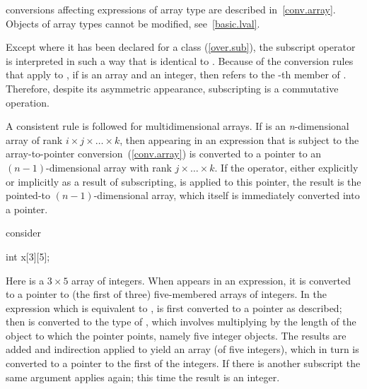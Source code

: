 \pnum
\begin{note}
conversions affecting expressions of array type are described in~\ref{conv.array}.
Objects of array types cannot be modified, see~\ref{basic.lval}.
\end{note}

\pnum
\begin{note}
Except where it has been declared for a class (\ref{over.sub}),
the subscript operator
\tcode{[]}
is interpreted
in such a way that
is identical to
.
Because of the conversion rules
that apply to
\tcode{+},
if
is an array and
an integer,
then
refers to the
-th
member of
.
Therefore,
despite its asymmetric
appearance, subscripting is a commutative operation.

\pnum
A consistent rule is followed for
%
multidimensional arrays.
If
is an
\textit{n}-dimensional
array
of rank
$i \times j \times \ldots \times k$,
then
appearing in an expression
that is subject to the array-to-pointer conversion~(\ref{conv.array})
is converted to
a pointer to an $(n-1)$-dimensional
array with rank
$j \times \ldots \times k$.
If the
\tcode{*}
operator, either explicitly
or implicitly as a result of subscripting,
is applied to this pointer,
the result is the pointed-to $(n-1)$-dimensional array,
which itself is immediately converted into a pointer.

\pnum
\begin{example}
consider

\begin{codeblock}
int x[3][5];
\end{codeblock}

Here
is a $3 \times 5$ array of integers.
When
appears in an expression, it is converted
to a pointer to (the first of three) five-membered arrays of integers.
In the expression
which is equivalent to
,
is first converted to a pointer as described;
then
is converted to the type of
,
which involves multiplying
by the
length of the object to which the pointer points,
namely five integer objects.
The results are added and indirection applied to
yield an array (of five integers), which in turn is converted to
a pointer to the first of the integers.
If there is another subscript the same argument applies
again; this time the result is an integer.
\end{example}
\end{note}

